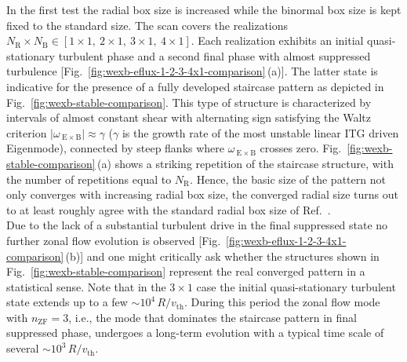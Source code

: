 \documentclass[aip, amsmath, amssymb, reprint, twocolumn, floatfix]{revtex4-1}
\newcommand{\wexb}{\omega_{\mathrm{\:E \times B}}}
\newcommand{\NR}{N_\mathrm{R}}
\newcommand{\NB}{N_\mathrm{B}}
\newcommand{\vth}{v_{\mathrm{th}}}
\newcommand{\nzf}{n_\mathrm{ZF}}
\begin{document}
In the first test the radial box size is increased while the binormal box size is kept fixed to the standard size. The scan covers the realizations $\NR\times\NB \in [ 1\times1,~2\times1,~3\times1,~4\times1]$.
Each realization exhibits an initial quasi-stationary turbulent phase and a second final \cite{Peeters2016} phase with almost suppressed turbulence [Fig.~\ref{fig:wexb-eflux-1-2-3-4x1-comparison}\,(a)].
The latter state is indicative for the presence of a fully developed staircase pattern as depicted in Fig.~\ref{fig:wexb-stable-comparison}. 
This type of structure is characterized by intervals of almost constant shear with alternating sign satisfying the Waltz criterion $|\wexb| \approx \gamma$\cite{Waltz1994, Waltz1998} ($\gamma$ is the growth rate of the most unstable linear ITG driven Eigenmode), connected by steep flanks where $\wexb$ crosses zero.
Fig.~\ref{fig:wexb-stable-comparison}\,(a) shows a striking repetition of the staircase structure, with the number of repetitions equal to $\NR$.
Hence, the basic size of the pattern not only converges with increasing radial box size, the converged radial size turns out to at least roughly agree with the standard radial box size of Ref.~. \\
Due to the lack of a substantial turbulent drive in the final suppressed state no further zonal flow evolution is observed [Fig.~\ref{fig:wexb-eflux-1-2-3-4x1-comparison}\,(b)] and one might critically ask whether the structures shown in Fig.~\ref{fig:wexb-stable-comparison} represent the real converged pattern in a statistical sense. 
Note that in the $3 \times 1$ case the initial quasi-stationary turbulent state extends up to a few $\sim 10^4\,R/\vth$.
During this period the zonal flow mode with $\nzf = 3$, i.e., the mode that dominates the staircase pattern in final suppressed phase, undergoes a long-term evolution with a typical time scale of several $\sim 10^3\,R/\vth$. 
\end{document}
